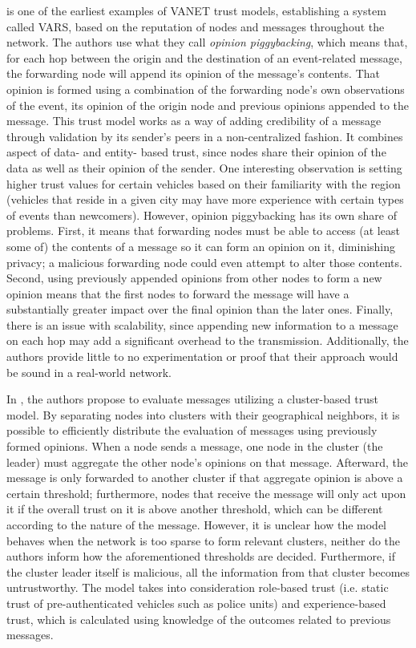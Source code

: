 \documentclass{article}
\begin{document}
\cite{dotzer2005vars} is one of the earliest examples of VANET trust models, establishing a system called VARS, based on the reputation of nodes and messages throughout the network.
The authors use what they call \textit{opinion piggybacking}, which means that, for each hop between the origin and the destination of an event-related message, the forwarding node will append its opinion of the message's contents.
That opinion is formed using a combination of the forwarding node's own observations of the event, its opinion of the origin node and previous opinions appended to the message.
This trust model works as a way of adding credibility of a message through validation by its sender's peers in a non-centralized fashion.
It combines aspect of data- and entity- based trust, since nodes share their opinion of the data as well as their opinion of the sender. 
One interesting observation is setting higher trust values for certain vehicles based on their familiarity with the region (vehicles that reside in a given city may have more experience with certain types of events than newcomers).
However, opinion piggybacking has its own share of problems.
First, it means that forwarding nodes must be able to access (at least some of) the contents of a message so it can form an opinion on it, diminishing privacy; a malicious forwarding node could even attempt to alter those contents.
Second, using previously appended opinions from other nodes to form a new opinion means that the first nodes to forward the message will have a substantially greater impact over the final opinion than the later ones.
Finally, there is an issue with scalability, since appending new information to a message on each hop may add a significant overhead to the transmission. Additionally, the authors provide little to no experimentation or proof that their approach would be sound in a real-world network.

In \cite{chen2010trust}, the authors propose to evaluate messages utilizing a cluster-based trust model.
By separating nodes into clusters with their geographical neighbors, it is possible to efficiently distribute the evaluation of messages using previously formed opinions.
When a node sends a message, one node in the cluster (the leader) must aggregate the other node's opinions on that message.
Afterward, the message is only forwarded to another cluster if that aggregate opinion is above a certain threshold; furthermore, nodes that receive the message will only act upon it if the overall trust on it is above another threshold, which can be different according to the nature of the message.
However, it is unclear how the model behaves when the network is too sparse to form relevant clusters, neither do the authors inform how the aforementioned thresholds are decided.
Furthermore, if the cluster leader itself is malicious, all the information from that cluster becomes untrustworthy. 
The model takes into consideration role-based trust (i.e. static trust of pre-authenticated vehicles such as police units) and experience-based trust, which is calculated using knowledge of the outcomes related to previous messages.
\end{document}
